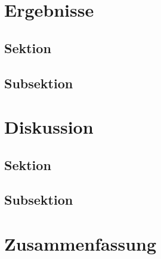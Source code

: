 \documentclass{scrreprt}
\begin{document}
\chapter{Ergebnisse}

\section{Sektion}
\section{Subsektion}

	
\chapter{Diskussion}

\section{Sektion}
\section{Subsektion}


\chapter{Zusammenfassung}



\listoffigures

\listoftables


 

\end{document}
